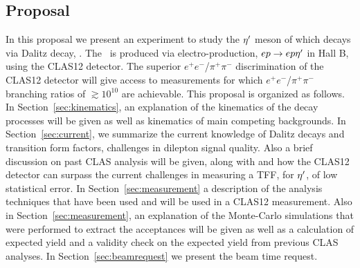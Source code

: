 \subsection{Proposal}
\indent In this proposal we present an experiment to study the $\eta^{\prime}$ meson of which decays via Dalitz decay, \etaDal. The \etaT \ is produced via electro-production, $ep \rightarrow ep\eta^{\prime}$ in Hall B, using the CLAS12 detector. The superior $e^+e^-$/$\pi^+\pi^-$ discrimination of the CLAS12 detector will give access to measurements for which  $e^+e^-$/$\pi^+\pi^-$ branching ratios of $\gtrsim 10^{10}$ are achievable.
This proposal is organized as follows. In Section~\ref{sec:kinematics}, an explanation of the kinematics of the decay processes will be given as well as kinematics of main competing backgrounds. In Section~\ref{sec:current}, we summarize the current knowledge of Dalitz decays and transition form factors, challenges in dilepton signal quality. Also a brief discussion on past CLAS analysis will be given, along with and how the CLAS12 detector can surpass the current challenges in measuring a TFF, for $\eta^{\prime}$, of low statistical error. In Section~\ref{sec:measurement} a description of the analysis techniques that have been used and will be used in a CLAS12 measurement. Also in Section~\ref{sec:measurement}, an explanation of the Monte-Carlo simulations that were performed to extract the acceptances will be given as well as a calculation of expected yield and a validity check on the expected yield from previous CLAS analyses. In Section~\ref{sec:beamrequest} we present the beam time request.



